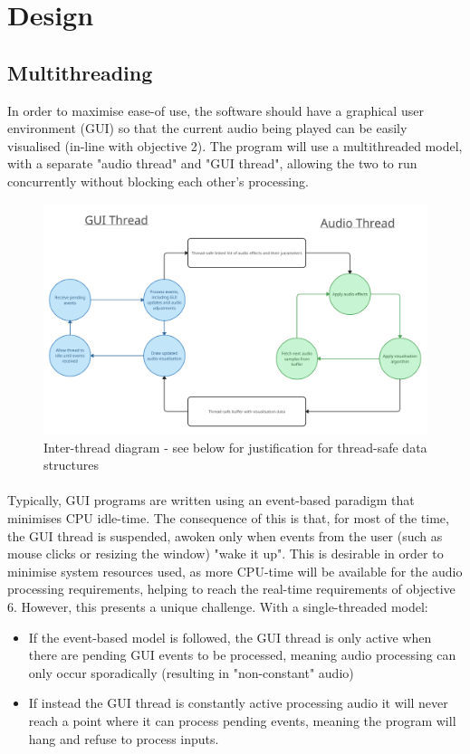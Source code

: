 \section { Design }

\subsection{Multithreading}
In order to maximise ease-of use, the software should have a graphical user environment (GUI) so that the current audio being played can be easily visualised (in-line with objective 2). The program will use a multithreaded model, with a separate "audio thread" and "GUI thread", allowing the two to run concurrently without blocking each other's processing.

\begin{figure}[h]
	\includegraphics[width=17cm]{./threading.png}
	\caption{Inter-thread diagram - see below for justification for thread-safe data structures}
\end{figure}

\paragraph{}
Typically, GUI programs are written using an event-based paradigm that minimises CPU idle-time. The consequence of this is that, for most of the time, the GUI thread is suspended, awoken only when events from the user (such as mouse clicks or resizing the window) "wake it up". This is desirable in order to minimise system resources used, as more CPU-time will be available for the audio processing requirements, helping to reach the real-time requirements of objective 6. However, this presents a unique challenge. With a single-threaded model:
\begin{itemize}
	\item If the event-based model is followed, the GUI thread is only active when there are pending GUI events to be processed, meaning audio processing can only occur sporadically (resulting in "non-constant" audio)
	\item If instead the GUI thread is constantly active processing audio it will never reach a point where it can process pending events, meaning the program will hang and refuse to process inputs.
\end{itemize}


